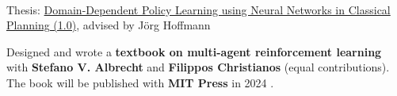 \documentclass[]{lukas-cv-openfont}
\begin{document}
\noindent
{}
\\
\begin{tightitemize}{1.7em}
    \item Thesis: \href{https://www.lukaschaefer.com/assets/files/bsc_thesis.pdf}{Domain-Dependent Policy Learning using Neural Networks in Classical Planning (1.0)}, advised by J\"org Hoffmann
\end{tightitemize}

\largesectionsep



\noindent
{}

\vspace{-0.5em}
\begin{flushleft}
    Designed and wrote a \textbf{textbook on multi-agent reinforcement learning} with \textbf{Stefano V. Albrecht} and \textbf{Filippos Christianos} (equal contributions). The book will be published with \textbf{MIT Press} in 2024 \cite{albrecht2024multi}.
\end{flushleft}
\sectionsep
\end{document}
